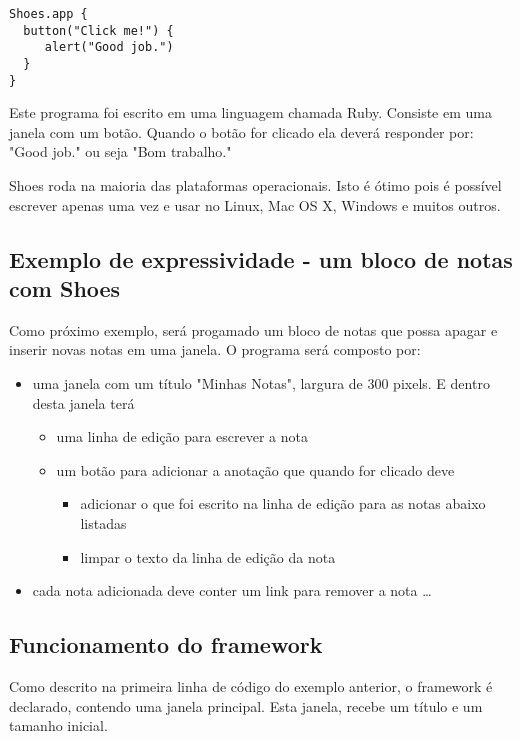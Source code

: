 \documentclass[espaco=simples,appendix=Name]{abnt}
\begin{document}
\begin{lstlisting}[caption=Primeiro exemplo do framework Shoes  ]
Shoes.app { 
  button("Click me!") {
     alert("Good job.") 
  }
} 
\end{lstlisting}

Este programa foi escrito em uma linguagem chamada Ruby. Consiste em uma janela com um botão. Quando o botão for clicado ela deverá responder por: "Good job." ou seja "Bom trabalho."

Shoes roda na maioria das plataformas operacionais. Isto é ótimo pois é possível escrever apenas uma vez e usar no Linux, Mac OS X, Windows e muitos outros.


\subsection{ Exemplo de expressividade - um bloco de notas com Shoes }

Como próximo exemplo, será progamado um bloco de notas que possa apagar e inserir novas notas em uma janela. O programa será composto por:
\begin{itemize} 
  \item uma janela com um título "Minhas Notas", largura de 300 pixels. E dentro desta janela terá 
  \begin{itemize} 
    \item uma linha de edição para escrever a nota
    \item um botão para adicionar a anotação que quando for clicado deve 
    \begin{itemize} 
      \item adicionar o que foi escrito na linha de edição para as notas abaixo listadas
      \item limpar o texto da linha de edição da nota
    \end{itemize} 
  \end{itemize} 
  \item cada nota adicionada deve conter um link para remover a nota \ldots
\end{itemize} 


\subsection { Funcionamento do framework }

Como descrito na primeira linha de código do exemplo anterior, o framework é declarado, contendo uma janela principal. Esta janela, recebe um título e um tamanho inicial.
\end{document}
